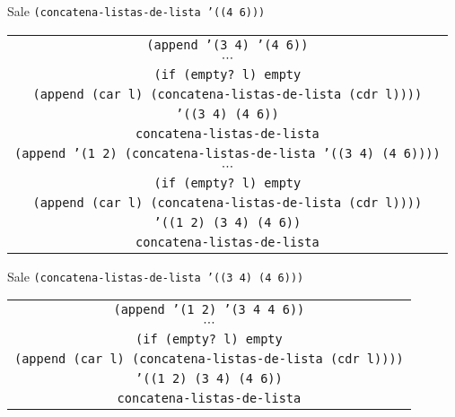 \documentclass[letterpaper,11pt]{article}
\begin{document}
\begin{enumerate}
\begin{enumerate}
        \newpage
        Sale \texttt{(concatena-listas-de-lista '((4 6)))}
        \begin{center}
            \begin{tabular}{|c|}
                \hline
                \texttt{(append '(3 4) '(4 6))}  \\
                $\cdots$ \\
                \texttt{(if (empty? l) empty} \\
                \texttt{(append (car l) (concatena-listas-de-lista (cdr l))))} \\
                \texttt{'((3 4) (4 6))} \\
                \texttt{concatena-listas-de-lista} \\
                \hline
                \hline
                \texttt{(append '(1 2) 
                (concatena-listas-de-lista '((3 4) (4 6))))}  \\
                $\cdots$ \\
                \texttt{(if (empty? l) empty} \\
                \texttt{(append (car l) (concatena-listas-de-lista (cdr l))))} \\
                \texttt{'((1 2) (3 4) (4 6))} \\
                \texttt{concatena-listas-de-lista} \\
                \hline
            \end{tabular}
        \end{center}

        Sale \texttt{(concatena-listas-de-lista '((3 4) (4 6)))}
        \begin{center}
            \begin{tabular}{|c|}
                \hline
                \texttt{(append '(1 2) '(3 4 4 6))}  \\
                $\cdots$ \\
                \texttt{(if (empty? l) empty} \\
                \texttt{(append (car l) (concatena-listas-de-lista (cdr l))))} \\
                \texttt{'((1 2) (3 4) (4 6))} \\
                \texttt{concatena-listas-de-lista} \\
                \hline
            \end{tabular}
        \end{center}


\end{enumerate}
\end{enumerate}
\end{document}
